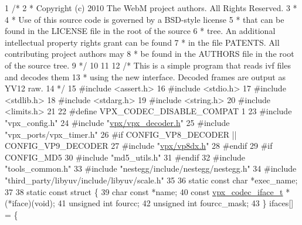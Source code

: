 \begin{DoxyCodeInclude}
1 \textcolor{comment}{/*}
2 \textcolor{comment}{ *  Copyright (c) 2010 The WebM project authors. All Rights Reserved.}
3 \textcolor{comment}{ *}
4 \textcolor{comment}{ *  Use of this source code is governed by a BSD-style license}
5 \textcolor{comment}{ *  that can be found in the LICENSE file in the root of the source}
6 \textcolor{comment}{ *  tree. An additional intellectual property rights grant can be found}
7 \textcolor{comment}{ *  in the file PATENTS.  All contributing project authors may}
8 \textcolor{comment}{ *  be found in the AUTHORS file in the root of the source tree.}
9 \textcolor{comment}{ */}
10 
11 
12 \textcolor{comment}{/* This is a simple program that reads ivf files and decodes them}
13 \textcolor{comment}{ * using the new interface. Decoded frames are output as YV12 raw.}
14 \textcolor{comment}{ */}
15 \textcolor{preprocessor}{#include <assert.h>}
16 \textcolor{preprocessor}{#include <stdio.h>}
17 \textcolor{preprocessor}{#include <stdlib.h>}
18 \textcolor{preprocessor}{#include <stdarg.h>}
19 \textcolor{preprocessor}{#include <string.h>}
20 \textcolor{preprocessor}{#include <limits.h>}
21 
22 \textcolor{preprocessor}{#define VPX\_CODEC\_DISABLE\_COMPAT 1}
23 \textcolor{preprocessor}{#include "vpx\_config.h"}
24 \textcolor{preprocessor}{#include "\hyperlink{vpx__decoder_8h}{vpx/vpx\_decoder.h}"}
25 \textcolor{preprocessor}{#include "vpx\_ports/vpx\_timer.h"}
26 \textcolor{preprocessor}{#if CONFIG\_VP8\_DECODER || CONFIG\_VP9\_DECODER}
27 \textcolor{preprocessor}{#include "\hyperlink{vp8dx_8h}{vpx/vp8dx.h}"}
28 \textcolor{preprocessor}{#endif}
29 \textcolor{preprocessor}{#if CONFIG\_MD5}
30 \textcolor{preprocessor}{#include "md5\_utils.h"}
31 \textcolor{preprocessor}{#endif}
32 \textcolor{preprocessor}{#include "tools\_common.h"}
33 \textcolor{preprocessor}{#include "nestegg/include/nestegg/nestegg.h"}
34 \textcolor{preprocessor}{#include "third\_party/libyuv/include/libyuv/scale.h"}
35 
36 \textcolor{keyword}{static} \textcolor{keyword}{const} \textcolor{keywordtype}{char} *exec\_name;
37 
38 \textcolor{keyword}{static} \textcolor{keyword}{const} \textcolor{keyword}{struct }\{
39   \textcolor{keywordtype}{char} \textcolor{keyword}{const} *name;
40   \textcolor{keyword}{const} \hyperlink{group__codec_gae99c3b04f4a567a311211cce3ae6b83b}{vpx\_codec\_iface\_t} *(*iface)(void);
41   \textcolor{keywordtype}{unsigned} \textcolor{keywordtype}{int}             fourcc;
42   \textcolor{keywordtype}{unsigned} \textcolor{keywordtype}{int}             fourcc\_mask;
43 \} ifaces[] = \{

\end{DoxyCodeInclude}
